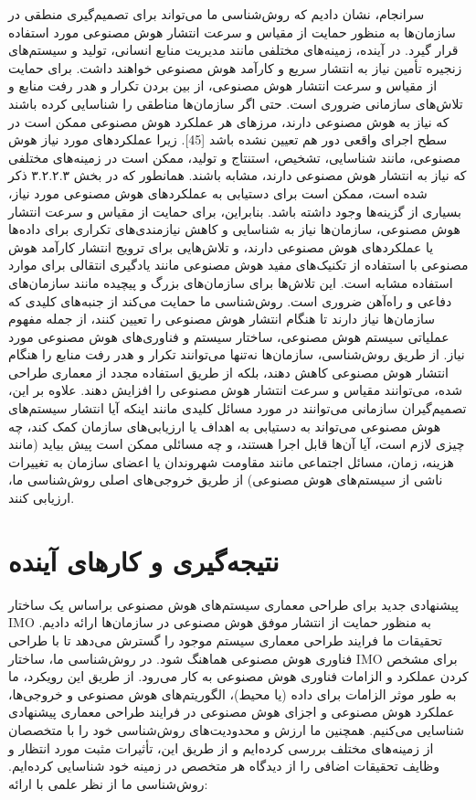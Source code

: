 \documentclass[a4paper,10pt]{article}
\begin{document}
        سرانجام، نشان دادیم که روش‌شناسی ما می‌تواند برای تصمیم‌گیری منطقی در سازمان‌ها به منظور حمایت از مقیاس و سرعت انتشار هوش مصنوعی مورد استفاده قرار گیرد. در آینده، زمینه‌های مختلفی مانند مدیریت منابع انسانی، تولید و سیستم‌های زنجیره تأمین نیاز به انتشار سریع و کارآمد هوش مصنوعی خواهند داشت. برای حمایت از مقیاس و سرعت انتشار هوش مصنوعی، از بین بردن تکرار و هدر رفت منابع و تلاش‌های سازمانی ضروری است. حتی اگر سازمان‌ها مناطقی را شناسایی کرده باشند که نیاز به هوش مصنوعی دارند، مرزهای هر عملکرد هوش مصنوعی ممکن است در سطح اجرای واقعی دور هم تعیین نشده باشد [45]. زیرا عملکردهای مورد نیاز هوش مصنوعی، مانند شناسایی، تشخیص، استنتاج و تولید، ممکن است در زمینه‌های مختلفی که نیاز به انتشار هوش مصنوعی دارند، مشابه باشند. همانطور که در بخش ۳.۲.۲.۳ ذکر شده است، ممکن است برای دستیابی به عملکردهای هوش مصنوعی مورد نیاز، بسیاری از گزینه‌ها وجود داشته باشد. بنابراین، برای حمایت از مقیاس و سرعت انتشار هوش مصنوعی، سازمان‌ها نیاز به شناسایی و کاهش نیازمندی‌های تکراری برای داده‌ها یا عملکردهای هوش مصنوعی دارند، و تلاش‌هایی برای ترویج انتشار کارآمد هوش مصنوعی با استفاده از تکنیک‌های مفید هوش مصنوعی مانند یادگیری انتقالی برای موارد استفاده مشابه است. این تلاش‌ها برای سازمان‌های بزرگ و پیچیده مانند سازمان‌های دفاعی و راه‌آهن ضروری است. روش‌شناسی ما حمایت می‌کند از جنبه‌های کلیدی که سازمان‌ها نیاز دارند تا هنگام انتشار هوش مصنوعی را تعیین کنند، از جمله مفهوم عملیاتی سیستم هوش مصنوعی، ساختار سیستم و فناوری‌های هوش مصنوعی مورد نیاز. از طریق روش‌شناسی، سازمان‌ها نه‌تنها می‌توانند تکرار و هدر رفت منابع را هنگام انتشار هوش مصنوعی کاهش دهند، بلکه از طریق استفاده مجدد از معماری طراحی شده، می‌توانند مقیاس و سرعت انتشار هوش مصنوعی را افزایش دهند. علاوه بر این، تصمیم‌گیران سازمانی می‌توانند در مورد مسائل کلیدی مانند اینکه آیا انتشار سیستم‌های هوش مصنوعی می‌تواند به دستیابی به اهداف یا ارزیابی‌های سازمان کمک کند، چه چیزی لازم است، آیا آن‌ها قابل اجرا هستند، و چه مسائلی ممکن است پیش بیاید (مانند هزینه، زمان، مسائل اجتماعی مانند مقاومت شهروندان یا اعضای سازمان به تغییرات ناشی از سیستم‌های هوش مصنوعی) از طریق خروجی‌های اصلی روش‌شناسی ما، ارزیابی کنند.

    \section{نتیجه‌گیری و کارهای آینده}

        پیشنهادی جدید برای طراحی معماری سیستم‌های هوش مصنوعی براساس یک ساختار IMO به منظور حمایت از انتشار موفق هوش مصنوعی در سازمان‌ها ارائه دادیم. تحقیقات ما فرایند طراحی معماری سیستم موجود را گسترش می‌دهد تا با طراحی فناوری هوش مصنوعی هماهنگ شود. در روش‌شناسی ما، ساختار IMO برای مشخص کردن عملکرد و الزامات فناوری هوش مصنوعی به کار می‌رود. از طریق این رویکرد، ما به طور موثر الزامات برای داده (یا محیط)، الگوریتم‌های هوش مصنوعی و خروجی‌ها، عملکرد هوش مصنوعی و اجزای هوش مصنوعی در فرایند طراحی معماری پیشنهادی شناسایی می‌کنیم. همچنین ما ارزش و محدودیت‌های روش‌شناسی خود را با متخصصان از زمینه‌های مختلف بررسی کرده‌ایم و از طریق این، تأثیرات مثبت مورد انتظار و وظایف تحقیقات اضافی را از دیدگاه هر متخصص در زمینه خود شناسایی کرده‌ایم. روش‌شناسی ما از نظر علمی با ارائه:
\end{document}
